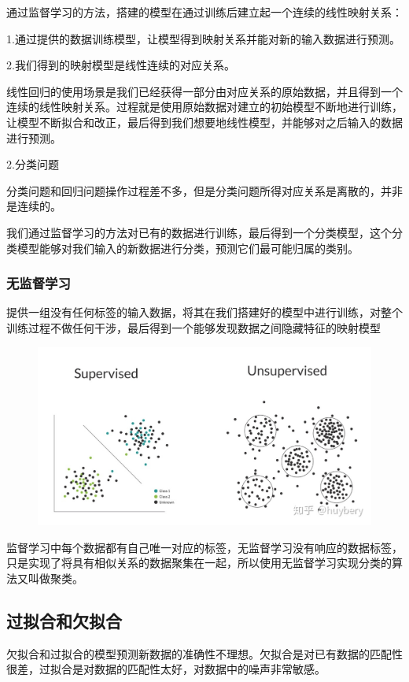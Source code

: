 \documentclass[openbib]{article}
\begin{document}
通过监督学习的方法，搭建的模型在通过训练后建立起一个连续的线性映射关系：

1.通过提供的数据训练模型，让模型得到映射关系并能对新的输入数据进行预测。

2.我们得到的映射模型是线性连续的对应关系。

线性回归的使用场景是我们已经获得一部分由对应关系的原始数据，并且得到一个连续的线性映射关系。过程就是使用原始数据对建立的初始模型不断地进行训练，让模型不断拟合和改正，最后得到我们想要地线性模型，并能够对之后输入的数据进行预测。

\begin{center}
	2.分类问题
\end{center}

分类问题和回归问题操作过程差不多，但是分类问题所得对应关系是离散的，并非是连续的。

我们通过监督学习的方法对已有的数据进行训练，最后得到一个分类模型，这个分类模型能够对我们输入的新数据进行分类，预测它们最可能归属的类别。
\subsubsection{无监督学习}

提供一组没有任何标签的输入数据，将其在我们搭建好的模型中进行训练，对整个训练过程不做任何干涉，最后得到一个能够发现数据之间隐藏特征的映射模型

\begin{figure}[htbp]
	\centering
	\includegraphics[scale=0.3]{3-3}
\end{figure}

监督学习中每个数据都有自己唯一对应的标签，无监督学习没有响应的数据标签，只是实现了将具有相似关系的数据聚集在一起，所以使用无监督学习实现分类的算法又叫做聚类。

\subsection{过拟合和欠拟合}
欠拟合和过拟合的模型预测新数据的准确性不理想。欠拟合是对已有数据的匹配性很差，过拟合是对数据的匹配性太好，对数据中的噪声非常敏感。
\end{document}
